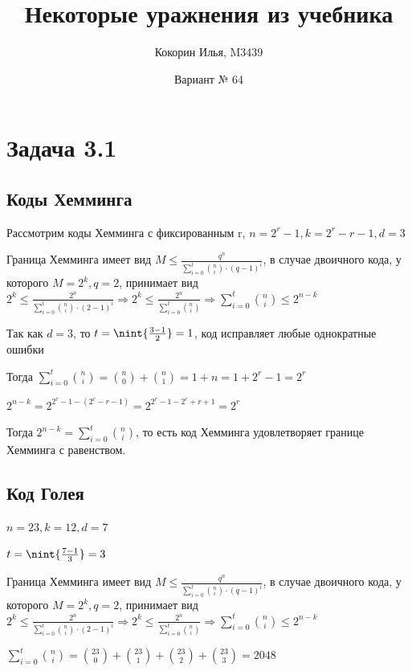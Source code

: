 \documentclass{article}
\title{Некоторые уражнения из учебника}
\author{Кокорин Илья, M3439}
\date{Вариант № 64}
\DeclarePairedDelimiter{\nint}\lfloor\rfloor
\begin{document}
	\maketitle
	\section{Задача 3.1}
	
	\subsection{Коды Хемминга}
	
	Рассмотрим коды Хемминга с фиксированным r, $n = 2^r - 1, k = 2^r - r - 1, d = 3$
	
	Граница Хемминга имеет вид $M \leq \frac{q^n}{\sum\limits_{i = 0}^t \binom{n}{i} \cdot (q - 1)^i}$, в случае двоичного кода, у которого $M = 2^k, q = 2$, принимает вид $2^k \leq \frac{2^n}{\sum\limits_{i = 0}^t \binom{n}{i} \cdot (2 - 1)^i} \Rightarrow 2^k \leq \frac{2^n}{\sum\limits_{i = 0}^t \binom{n}{i}} \Rightarrow \sum\limits_{i = 0}^t \binom{n}{i} \leq 2^{n - k}$
	
	Так как $d = 3$, то $t = \nint{\frac{3 - 1}{2}} = 1$, код исправляет любые однократные ошибки
	
	Тогда $ \sum\limits_{i = 0}^t \binom{n}{i} = \binom{n}{0} + \binom{n}{1} = 1 + n = 1 + 2^r -1 = 2^r$
	
	$2^{n - k} = 2^{2^r - 1 - (2^r - r - 1)} = 2^{2^r - 1 - 2^r + r + 1} = 2^r$
	
	Тогда $2^{n - k} = \sum\limits_{i = 0}^t \binom{n}{i} $, то есть код Хемминга удовлетворяет границе Хемминга с равенством.
	
	\subsection{Код Голея}
	
	$n = 23, k = 12, d = 7$
	
	$t = \nint{\frac{7 - 1}{3}} = 3$
	
	Граница Хемминга имеет вид $M \leq \frac{q^n}{\sum\limits_{i = 0}^t \binom{n}{i} \cdot (q - 1)^i}$, в случае двоичного кода, у которого $M = 2^k, q = 2$, принимает вид $2^k \leq \frac{2^n}{\sum\limits_{i = 0}^t \binom{n}{i} \cdot (2 - 1)^i} \Rightarrow 2^k \leq \frac{2^n}{\sum\limits_{i = 0}^t \binom{n}{i}} \Rightarrow \sum\limits_{i = 0}^t \binom{n}{i} \leq 2^{n - k}$
	
	$ \sum\limits_{i = 0}^t \binom{n}{i} = \binom{23}{0} + \binom{23}{1} + \binom{23}{2} + \binom{23}{3} = 2048$
	
\end{document}
